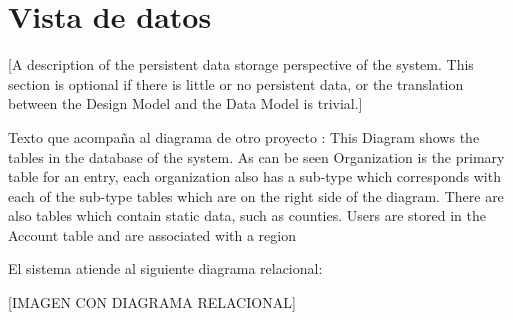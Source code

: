 \chapter{Vista de datos}

[A description of the persistent data storage perspective of the system. This section is optional if there is little or no persistent data, or the translation between the Design Model and the Data Model is trivial.]

Texto que acompaña al diagrama de otro proyecto :
 This Diagram shows the tables in the database of the system. As can be seen Organization is the primary table for an entry, each organization also has a sub-type which corresponds with each of the sub-type tables which are on the right side of the diagram. There are also tables which contain static data, such as counties. Users are stored in the Account table and are associated with a region

El sistema atiende al siguiente diagrama relacional:

[IMAGEN CON DIAGRAMA RELACIONAL]




